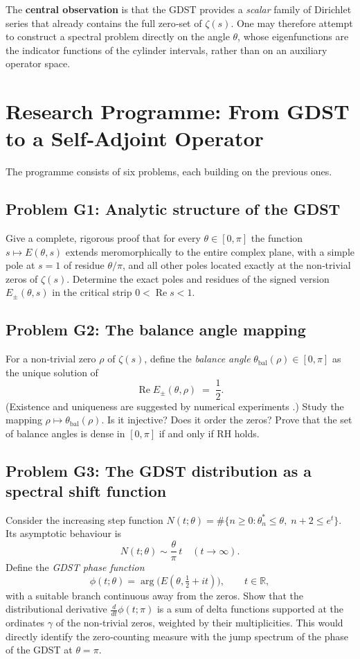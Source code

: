 \documentclass[11pt,a4paper]{article}
\theoremstyle{remark}
\begin{document}
The \textbf{central observation} is that the GDST provides a \emph{scalar} family of Dirichlet series that already contains the full zero‑set of \(\zeta(s)\).  One may therefore attempt to construct a spectral problem directly on the angle \(\theta\), whose eigenfunctions are the indicator functions of the cylinder intervals, rather than on an auxiliary operator space.

\section{Research Programme: From GDST to a Self‑Adjoint Operator}
The programme consists of six problems, each building on the previous ones.

\subsection{Problem G1: Analytic structure of the GDST}
Give a complete, rigorous proof that for every \(\theta\in[0,\pi]\) the function \(s\mapsto E(\theta,s)\) extends meromorphically to the entire complex plane, with a simple pole at \(s=1\) of residue \(\theta/\pi\), and all other poles located exactly at the non‑trivial zeros of \(\zeta(s)\).  Determine the exact poles and residues of the signed version \(E_\pm(\theta,s)\) in the critical strip \(0<\operatorname{Re}s<1\).

\subsection{Problem G2: The balance angle mapping}
For a non‑trivial zero \(\rho\) of \(\zeta(s)\), define the \emph{balance angle} \(\theta_{\mathrm{bal}}(\rho)\in[0,\pi]\) as the unique solution of
\[
\operatorname{Re} E_\pm(\theta,\rho) \;=\; \frac12 .
\]
(Existence and uniqueness are suggested by numerical experiments \cite{Geere2026GHeta}.)  Study the mapping \(\rho\mapsto\theta_{\mathrm{bal}}(\rho)\).  Is it injective?  Does it order the zeros?  Prove that the set of balance angles is dense in \([0,\pi]\) if and only if RH holds.

\subsection{Problem G3: The GDST distribution as a spectral shift function}
Consider the increasing step function \(N(t;\theta)=\#\{n\ge 0:\theta_n^*\le\theta,\; n+2\le e^{t}\}\).  Its asymptotic behaviour is
\[
N(t;\theta) \sim \frac{\theta}{\pi}\,t \quad (t\to\infty).
\]
Define the \emph{GDST phase function}
\[
\phi(t;\theta) = \arg \bigl( E(\theta,\tfrac12+it) \bigr),\qquad t\in\mathbb{R},
\]
with a suitable branch continuous away from the zeros.  Show that the distributional derivative \(\frac{d}{dt}\phi(t;\pi)\) is a sum of delta functions supported at the ordinates \(\gamma\) of the non‑trivial zeros, weighted by their multiplicities.  This would directly identify the zero‑counting measure with the jump spectrum of the phase of the GDST at \(\theta=\pi\).
\end{document}

